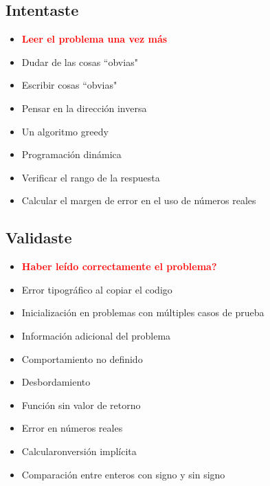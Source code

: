 \subsection{Intentaste}

\begin{itemize}
    \item \textcolor{red}{\textbf{Leer el problema una vez más}}
    \item Dudar de las cosas ``obvias"
    \item Escribir cosas ``obvias"
    \item Pensar en la dirección inversa
    \item Un algoritmo greedy
    \item Programación dinámica
    \item Verificar el rango de la respuesta
    \item Calcular el margen de error en el uso de números reales
\end{itemize}

\subsection{Validaste}

\begin{itemize}
    \item \textcolor{red}{\textbf{Haber leído correctamente el problema?}}
    \item Error tipográfico al copiar el codigo
    \item Inicialización en problemas con múltiples casos de prueba
    \item Información adicional del problema
    \item Comportamiento no definido
    \item Desbordamiento
    \item Función sin valor de retorno
    \item Error en números reales
    \item Calcularonversión implícita
    \item Comparación entre enteros con signo y sin signo
\end{itemize}
